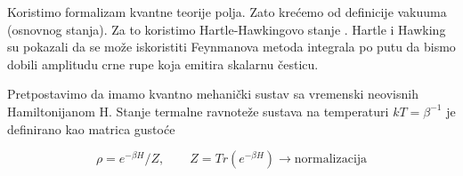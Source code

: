 






Koristimo formalizam kvantne teorije polja. Zato krećemo od definicije vakuuma (osnovnog stanja). Za to koristimo Hartle-Hawkingovo stanje \citep{HartleHawking}. Hartle i Hawking su pokazali da se može iskoristiti Feynmanova metoda integrala po putu da bismo dobili amplitudu crne rupe koja emitira skalarnu česticu. 

\noindent Pretpostavimo da imamo kvantno mehanički sustav sa vremenski neovisnih Hamiltonijanom H. Stanje termalne ravnoteže sustava na temperaturi $kT=\beta^{-1}$ je definirano kao matrica gustoće \citep{wald2010general}

\begin{equation*}
\rho=e^{-\beta H}/Z,\qquad Z=Tr(e^{-\beta H}) \to \textrm{normalizacija}
\end{equation*}


